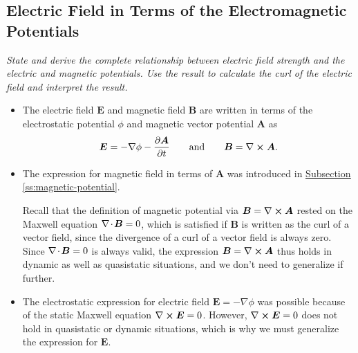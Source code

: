 \documentclass[11pt, a4paper]{article}
\renewcommand{\vec}[1]{\bm{#1}} %
\newcommand{\E}{\vec{E}} %
\newcommand{\B}{\vec{B}} %
\newcommand{\A}{\vec{A}} %
\renewcommand{\div}{\nabla \mspace{-2mu} \cdot \mspace{-2mu}}
\renewcommand{\curl}{\nabla \cross}
\renewcommand{\grad}{\nabla}
\begin{document}
    
\subsection{Electric Field in Terms of the Electromagnetic Potentials}
\textit{State and derive the complete relationship between electric field strength and the electric and magnetic potentials. Use the result to calculate the curl of the electric field and interpret the result.}

\begin{itemize}
    \item The electric field $ \E $ and magnetic field $ \B $ are written in terms of the electrostatic potential $ \phi $ and magnetic vector potential $ \A $ as
    \begin{equation*}
        \E = - \grad \phi - \pdv{\A}{t} \qquad \text{and} \qquad \B = \curl \A.
    \end{equation*}

    \item The expression for magnetic field in terms of $ \A $ was introduced in \hyperref[ss:magnetic-potential]{\underline{Subsection \ref{ss:magnetic-potential}}}.

    Recall that the definition of magnetic potential via $ \B = \curl \A $ rested on the Maxwell equation $ \div \B = 0 $, which is satisfied if $ \B $ is written as the curl of a vector field, since the divergence of a curl of a vector field is always zero. Since $ \div \B = 0 $ is always valid, the expression $ \B = \curl \A $ thus holds in dynamic as well as quasistatic situations, and we don't need to generalize if further.

    \item The electrostatic expression for electric field $ \E = - \grad \phi $ was possible because of the static Maxwell equation $ \curl \E = 0 $. However, $ \curl \E = 0 $ does not hold in quasistatic or dynamic situations, which is why we must generalize the expression for $ \E $.

\end{itemize}
\end{document}
